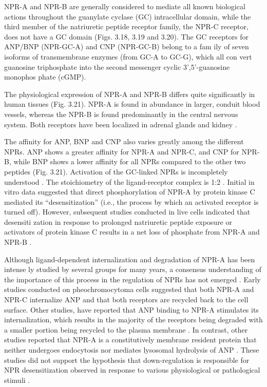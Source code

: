 \documentclass[14pt,a4paper,onecolumn]{extarticle}
\begin{document}
NPR-A and NPR-B are generally considered to mediate all known biological actions throughout the guanylate cyclase (GC) intracellular domain, while the third member of the natriuretic peptide receptor family, the NPR-C receptor, does not have a GC domain (Figs. 3.18, 3.19 and 3.20).  The GC receptors for ANP/BNP (NPR-GC-A) and CNP (NPR-GC-B) belong to a fam ily of seven isoforms of transmembrane enzymes (from GC-A to GC-G), which all con vert guanosine triphosphate into the second messenger cyclic 3’,5’-guanosine monophos phate (cGMP).

The physiological expression of NPR-A and NPR-B differs quite significantly in human tissues (Fig. 3.21). NPR-A is found in abundance in larger, conduit blood vessels, whereas the NPR-B is found predominantly in the central nervous system. Both receptors have been localized in adrenal glands and kidney \citep{168}.

The affinity for ANP, BNP and CNP also varies greatly among the different NPRs.  ANP shows a greater affinity for NPR-A and NPR-C, and CNP for NPR-B, while BNP shows a lower affinity for all NPRs compared to the other two peptides (Fig. 3.21).  Activation of the GC-linked NPRs is incompletely understood \citep{172}.
The stoichiometry of the ligand-receptor complex is 1:2 \citep{177}.
Initial in vitro data suggested that direct phosphorylation of NPR-A by protein kinase C mediated its “desensitization” (i.e., the process by which an activated receptor is turned off). However, subsequent studies conducted in live cells indicated that desensiti zation in response to prolonged natriuretic peptide exposure or activators of protein kinase C results in a net loss of phosphate from NPR-A and NPR-B \citep{182}.

Although ligand-dependent internalization and degradation of NPR-A has been intense ly studied by several groups for many years, a consensus understanding of the importance of this process in the regulation of NPRs has not emerged \citep{182}. Early studies conducted on pheochromocytoma cells suggested that both NPR-A and NPR-C internalize ANP and that both receptors are recycled back to the cell surface. Other studies, have reported that ANP binding to NPR-A stimulates its internalization, which results in the majority of the receptors being degraded with a smaller portion being recycled to the plasma membrane \citep{186} \citep{187}. In contrast, other studies reported that NPR-A is a constitutively membrane resident protein that neither undergoes endocytosis nor mediates lysosomal hydrolysis of ANP \citep{189}.  These studies did not support the hypothesis that down-regulation is responsible for NPR desensitization observed in response to various physiological or pathological stimuli \citep{182}.
\end{document}

